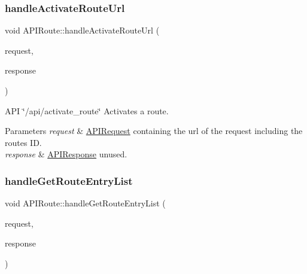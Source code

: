 \subsubsection{\texorpdfstring{handle\+Activate\+Route\+Url}{handleActivateRouteUrl}}
{\footnotesize\ttfamily void A\+P\+I\+Route\+::handle\+Activate\+Route\+Url (\begin{DoxyParamCaption}\item[{const \hyperlink{class_a_p_i_request}{A\+P\+I\+Request} \&}]{request,  }\item[{\hyperlink{class_a_p_i_response}{A\+P\+I\+Response} $\ast$}]{response }\end{DoxyParamCaption})\hspace{0.3cm}{\ttfamily [slot]}}

A\+PI \char`\"{}/api/activate\+\_\+route\char`\"{} Activates a route. 
\begin{DoxyParams}{Parameters}
{\em request} & \hyperlink{class_a_p_i_request}{A\+P\+I\+Request} containing the url of the request including the route\textquotesingle{}s ID. \\
\hline
{\em response} & \hyperlink{class_a_p_i_response}{A\+P\+I\+Response} unused. \\
\hline
\end{DoxyParams}
\mbox{\label{class_a_p_i_route_a95f38f3fb39801deba8d4a39e14686d2}} 
\subsubsection{\texorpdfstring{handle\+Get\+Route\+Entry\+List}{handleGetRouteEntryList}}
{\footnotesize\ttfamily void A\+P\+I\+Route\+::handle\+Get\+Route\+Entry\+List (\begin{DoxyParamCaption}\item[{const \hyperlink{class_a_p_i_request}{A\+P\+I\+Request} \&}]{request,  }\item[{\hyperlink{class_a_p_i_response}{A\+P\+I\+Response} $\ast$}]{response }\end{DoxyParamCaption})\hspace{0.3cm}{\ttfamily [slot]}}

